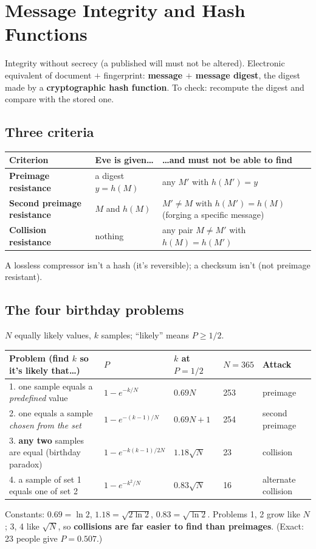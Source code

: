 \section{Message Integrity and Hash Functions}

Integrity without secrecy (a published will must not be altered). Electronic equivalent of document $+$ fingerprint: \textbf{message $+$ message digest}, the digest made by a \textbf{cryptographic hash function}. To check: recompute the digest and compare with the stored one.

\subsection{Three criteria}
\begin{center}\small
\begin{tabularx}{\textwidth}{@{}l X X@{}}
\toprule
Criterion & Eve is given\dots & \dots and must not be able to find\\
\midrule
\textbf{Preimage resistance} & a digest $y = h(M)$ & any $M'$ with $h(M') = y$\\
\textbf{Second preimage resistance} & $M$ and $h(M)$ & $M' \ne M$ with $h(M') = h(M)$ (forging a specific message)\\
\textbf{Collision resistance} & nothing & any pair $M \ne M'$ with $h(M) = h(M')$\\
\bottomrule
\end{tabularx}
\end{center}
A lossless compressor isn't a hash (it's reversible); a checksum isn't (not preimage resistant).

\subsection{The four birthday problems}
$N$ equally likely values, $k$ samples; ``likely'' means $P \ge 1/2$.
\begin{center}\small
\begin{tabular}{@{}lllll@{}}
\toprule
Problem (find $k$ so it's likely that\dots) & $P$ & $k$ at $P = 1/2$ & $N = 365$ & Attack\\
\midrule
1. one sample equals a \emph{predefined} value & $1 - e^{-k/N}$ & $0.69N$ & 253 & preimage\\
2. one equals a sample \emph{chosen from the set} & $1 - e^{-(k-1)/N}$ & $0.69N + 1$ & 254 & second preimage\\
3. \textbf{any two} samples are equal (birthday paradox) & $1 - e^{-k(k-1)/2N}$ & $1.18\sqrt N$ & 23 & collision\\
4. a sample of set 1 equals one of set 2 & $1 - e^{-k^2/N}$ & $0.83\sqrt N$ & 16 & alternate collision\\
\bottomrule
\end{tabular}
\end{center}
Constants: $0.69 = \ln 2$, $1.18 = \sqrt{2\ln 2}$, $0.83 = \sqrt{\ln 2}$. Problems 1, 2 grow like $N$; 3, 4 like $\sqrt N$, so \textbf{collisions are far easier to find than preimages}. (Exact: 23 people give $P = 0.507$.)


